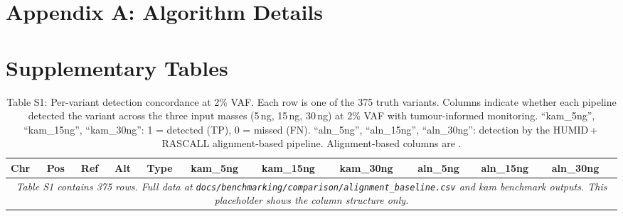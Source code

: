 \section*{Appendix A: Algorithm Details}

\newpage
\section*{Supplementary Tables}


\begin{table}[h]
  \centering
  \caption{Table S1: Per-variant detection concordance at 2\% VAF.
    Each row is one of the 375 truth variants.
    Columns indicate whether each pipeline detected the variant across the
    three input masses (5\,ng, 15\,ng, 30\,ng) at 2\% VAF with tumour-informed
    monitoring.
    ``kam\_5ng'', ``kam\_15ng'', ``kam\_30ng'': 1 = detected (TP), 0 = missed (FN).
    ``aln\_5ng'', ``aln\_15ng'', ``aln\_30ng'': detection by the
    HUMID\,+\,RASCALL alignment-based pipeline.
    Alignment-based columns are .}
  \label{tab:s1-concordance}
  \small
  \begin{tabular}{lllllllllll}
    \toprule
    Chr & Pos & Ref & Alt & Type
      & kam\_5ng & kam\_15ng & kam\_30ng
      & aln\_5ng & aln\_15ng & aln\_30ng \\
    \midrule
    \multicolumn{11}{c}{\textit{Table S1 contains 375 rows.
      Full data at \texttt{docs/benchmarking/comparison/alignment\_baseline.csv}
      and kam benchmark outputs.
      This placeholder shows the column structure only.}} \\
    \bottomrule
  \end{tabular}
\end{table}


